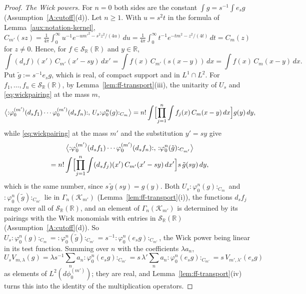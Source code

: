 \documentclass[11pt,a4paper]{article}
\theoremstyle{plain}
\theoremstyle{definition}
\theoremstyle{plain}
\theoremstyle{definition}
\newcommand{\R}{\mathbb{R}}
\begin{document}
\begin{proof}
\emph{The Wick powers.}  For $n=0$ both sides are the constant $\int g=s^{-1}\int e_sg$
(Assumption~\ref{A:cutoff}(d)).  Let $n\ge1$.  With $u=s^2t$ in the formula of
Lemma~\ref{aux:notation-kernel}, $C_{m'}(sz)=\frac1{4\pi}\int_0^\infty u^{-1}e^{-um'^2-s^2z^2/(4u)}
\,du=\frac1{4\pi}\int_0^\infty t^{-1}e^{-tm^2-z^2/(4t)}\,dt=C_m(z)$ for $z\ne0$.  Hence, for
$f\in\mathcal S_\R(\R)$ and $y\in\R$,
\[
 \int(d_sf)(x')\,C_{m'}(x'-sy)\,dx'=\int f(x)\,C_{m'}(s(x-y))\,dx=\int f(x)\,C_m(x-y)\,dx .
\]
Put $\tilde g:=s^{-1}e_sg$, which is real, of compact support and in $L^1\cap L^2$.  For
$f_1,\dots,f_n\in\mathcal S_\R(\R)$, by Lemma~\ref{lem:ff-transport}(iii), the unitarity of
$U_s$ and \eqref{eq:wickpairing} at the mass $m$,
\[
 \bigl\langle{:}\varphi_0^{(m')}(d_sf_1)\cdots\varphi_0^{(m')}(d_sf_n){:},\,
   U_s{:}\varphi_0^n(g){:}_{C_m}\bigr\rangle
 =n!\int\Bigl[\prod_{j=1}^n\int f_j(x)\,C_m(x-y)\,dx\Bigr]g(y)\,dy ,
\]
while \eqref{eq:wickpairing} at the mass $m'$ and the substitution $y'=sy$ give
\begin{multline*}
 \bigl\langle{:}\varphi_0^{(m')}(d_sf_1)\cdots\varphi_0^{(m')}(d_sf_n){:},\,
   {:}\varphi_0^n(\tilde g){:}_{C_{m'}}\bigr\rangle\\
 =n!\int\Bigl[\prod_{j=1}^n\int(d_sf_j)(x')\,C_{m'}(x'-sy)\,dx'\Bigr]s\,\tilde g(sy)\,dy ,
\end{multline*}
which is the same number, since $s\,\tilde g(sy)=g(y)$.  Both $U_s{:}\varphi_0^n(g){:}_{C_m}$
and ${:}\varphi_0^n(\tilde g){:}_{C_{m'}}$ lie in $\Gamma_n(\mathcal K_{m'})$
(Lemma~\ref{lem:ff-transport}(i)), the functions $d_sf_j$ range over all of $\mathcal
S_\R(\R)$, and an element of $\Gamma_n(\mathcal K_{m'})$ is determined by its pairings with the
Wick monomials with entries in $\mathcal S_\R(\R)$ (Assumption~\ref{A:cutoff}(d)).  So
$U_s{:}\varphi_0^n(g){:}_{C_m}={:}\varphi_0^n(\tilde g){:}_{C_{m'}}=s^{-1}{:}\varphi_0^n(e_sg){:}_{C_{m'}}$,
the Wick power being linear in its test function.  Summing over $n$ with the coefficients
$\lambda a_n$,
\[
 U_sV_{m,\lambda}(g)=\lambda s^{-1}\sum_na_n{:}\varphi_0^n(e_sg){:}_{C_{m'}}
 =s\,\lambda'\sum_na_n{:}\varphi_0^n(e_sg){:}_{C_{m'}}=s\,V_{m',\lambda'}(e_sg)
\]
as elements of $L^2(d\phi_0^{(m')})$; they are real, and Lemma~\ref{lem:ff-transport}(iv) turns
this into the identity of the multiplication operators.
\end{proof}
\end{document}
